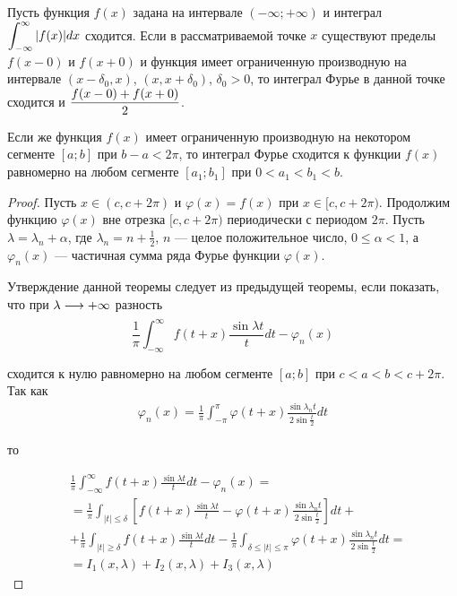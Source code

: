 \begin{theorem}
    Пусть функция $f(x)$ задана на интервале $(-\infty; +\infty)$ и интеграл
    $\displaystyle\int_{-\infty}^\infty |f(x)| dx$ сходится. Если в рассматриваемой
    точке $x$ существуют пределы $f(x - 0)$ и $f(x + 0)$ и функция имеет
    ограниченную производную на интервале $(x - \delta_0, x)$, 
    $(x, x + \delta_0)$, $\delta_0 > 0$, то интеграл Фурье в данной точке
    сходится и $\displaystyle\frac{f(x - 0) + f(x + 0)}{2}$.

    Если же функция $f(x)$ имеет ограниченную производную на некотором
    сегменте $[a; b]$ при $b - a < 2\pi$, то интеграл Фурье сходится к функции
    $f(x)$ равномерно на любом сегменте $[a_1; b_1]$ при $0 < a_1 < b_1 < b$.
\end{theorem}
\begin{proof}
    Пусть $x \in (c, c + 2\pi)$ и $\varphi(x) = f(x)$ при $x \in [c, c + 2\pi)$.
    Продолжим функцию $\varphi(x)$ вне отрезка $[c, c + 2\pi)$ периодически с
    периодом $2\pi$. Пусть $\lambda = \lambda_n + \alpha$, где
    $\lambda_n = n + \frac{1}{2}$, $n$ --- целое положительное число,
    $0 \leq \alpha < 1$, а $\varphi_n(x)$ --- частичная сумма ряда Фурье
    функции $\varphi(x)$.

    Утверждение данной теоремы следует из предыдущей теоремы, если показать, что
    при $\lambda \underset{}{\longrightarrow} +\infty$ разность 
    \[ \frac{1}{\pi} \int_{-\infty}^\infty f(t + x) \frac{\sin \lambda t}{t} dt - \varphi_n(x) \]

    сходится к нулю равномерно на любом сегменте $[a; b]$ при
    $c < a < b < c + 2\pi$. Так как 
    \begin{align*}
        \varphi_n(x) = \frac{1}{\pi} \int_{-\pi}^\pi \varphi(t + x) 
            \frac{\sin \lambda_n t}{2 \sin \frac{t}{2}} dt
    \end{align*}

    то

    \begin{align*}
        &\frac{1}{\pi} \int_{-\infty}^\infty f(t + x)
            \frac{\sin \lambda t}{t} dt - \varphi_n(x) = \\
        &= \frac{1}{\pi} \int_{|t| \leq \delta} \left[
            f(t + x) \frac{\sin \lambda t}{t} -
            \varphi(t + x) \frac{\sin \lambda_n t}{2 \sin \frac{t}{2}}
        \right] dt + \\
        &+ \frac{1}{\pi} \int_{|t| \geq \delta}
            f(t + x) \frac{\sin \lambda t}{t} dt -
        \frac{1}{\pi} \int_{\delta \leq |t| \leq \pi}
            \varphi(t + x) \frac{\sin \lambda_n t}{2 \sin \frac{t}{2}} dt = \\
        &= I_1(x, \lambda) + I_2(x, \lambda) + I_3(x, \lambda)
    \end{align*}


\end{proof}
